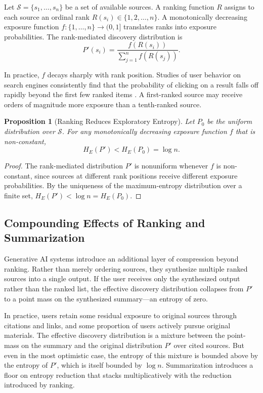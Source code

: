 \documentclass[12pt,a4paper]{article}
\theoremstyle{definition}
\theoremstyle{plain}
\newtheorem{proposition}[definition]{Proposition}
\theoremstyle{remark}
\newcommand{\HE}{H_{E}}
\newcommand{\calS}{\mathcal{S}}
\begin{document}
Let $\calS = \{s_1, \ldots, s_n\}$ be a set of available sources. A ranking function $R$
assigns to each source an ordinal rank $R(s_i) \in \{1, 2, \ldots, n\}$. A monotonically
decreasing exposure function $f : \{1,\ldots,n\} \to (0,1]$ translates ranks into exposure
probabilities. The rank-mediated discovery distribution is
\[
P'(s_i) = \frac{f(R(s_i))}{\sum_{j=1}^n f(R(s_j))}.
\]

In practice, $f$ decays sharply with rank position. Studies of user behavior on search
engines consistently find that the probability of clicking on a result falls off rapidly
beyond the first few ranked items \citep{lazer2009,raghavan2023}. A first-ranked source may
receive orders of magnitude more exposure than a tenth-ranked source.

\begin{proposition}[Ranking Reduces Exploratory Entropy]
\label{prop:ranking}
Let $P_0$ be the uniform distribution over $\calS$. For any monotonically decreasing exposure
function $f$ that is non-constant,
\[
\HE(P') < \HE(P_0) = \log n.
\]
\end{proposition}

\begin{proof}
The rank-mediated distribution $P'$ is nonuniform whenever $f$ is non-constant, since
sources at different rank positions receive different exposure probabilities. By the
uniqueness of the maximum-entropy distribution over a finite set, $\HE(P') < \log n =
\HE(P_0)$.
\end{proof}

\subsection{Compounding Effects of Ranking and Summarization}

Generative AI systems introduce an additional layer of compression beyond ranking. Rather
than merely ordering sources, they synthesize multiple ranked sources into a single
output. If the user receives only the synthesized output rather than the ranked list, the
effective discovery distribution collapses from $P'$ to a point mass on the synthesized
summary---an entropy of zero.

In practice, users retain some residual exposure to original sources through citations and
links, and some proportion of users actively pursue original materials. The effective
discovery distribution is a mixture between the point-mass on the summary and the original
distribution $P'$ over cited sources. But even in the most optimistic case, the entropy of
this mixture is bounded above by the entropy of $P'$, which is itself bounded by $\log n$.
Summarization introduces a floor on entropy reduction that stacks multiplicatively with the
reduction introduced by ranking.
\end{document}
